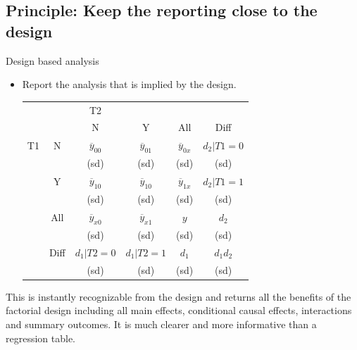 \documentclass[
  11pt,
  ignorenonframetext,
]{beamer}
\begin{document}
\hypertarget{principle-keep-the-reporting-close-to-the-design}{%
\subsection{Principle: Keep the reporting close to the
design}\label{principle-keep-the-reporting-close-to-the-design}}

\begin{frame}{Design based analysis}
\protect\hypertarget{design-based-analysis}{}
\begin{itemize}
    \item  Report the analysis that is implied by the design. 
\bigskip

\begin{table}
\small \centering
\begin{tabular}{cc|ccc|c}\small

           &            &         T2 &            &            &            \\

           &            &          N &          Y &        All &       Diff \\ \hline

        T1 &          N &     \color{blue}$\overline{y}_{00}$ &     \color{blue}$\overline{y}_{01}$ &     $\overline{y}_{0x}$ &    $d_2|T1=0$ \\

           &            &       (sd) &       (sd) &       (sd) &       (sd) \\

           &          Y &     \color{blue}$\overline{y}_{10}$ &     \color{blue}$\overline{y}_{10}$ &         $\overline{y}_{1x}$ &    $d_2|T1=1$ \\

           &            &       (sd) &       (sd) &       (sd) &       (sd) \\

           &        All &     $\overline{y}_{x0}$ &     $\overline{y}_{x1}$ &          $y$ &    \color{red}$d_2$ \\

           &            &       (sd) &       (sd) &       (sd) &       (sd) \\ \hline

           &       Diff &    $d_1|T2=0$ &    $d_1|T2=1$ &    \color{red}$d_1$ &    \color{green} $d_1d_2$ \\

           &            &       (sd) &       (sd) &       (sd) &       (sd) \\

\end{tabular}  
\end{table}
\end{itemize}

\small This is instantly recognizable from the design and returns all
the benefits of the factorial design including all main effects,
conditional causal effects, interactions and summary outcomes. It is
much clearer and more informative than a regression table.
\end{frame}
\end{document}
